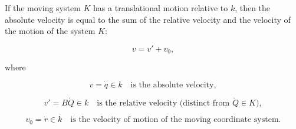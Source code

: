 If the moving system $K$ has a translational motion relative to $k$, then the absolute velocity is equal to the sum of the relative velocity and the velocity of the motion of the system $K$:

$$v = v' + v_0,$$

where

$$v = \dot{q} \in k \quad \text{is the absolute velocity},$$

$$v' = B\dot{Q} \in k \quad \text{is the relative velocity (distinct from } \dot{Q} \in K\text{)},$$

$$v_0 = \dot{r} \in k \quad \text{is the velocity of motion of the moving coordinate system.}$$